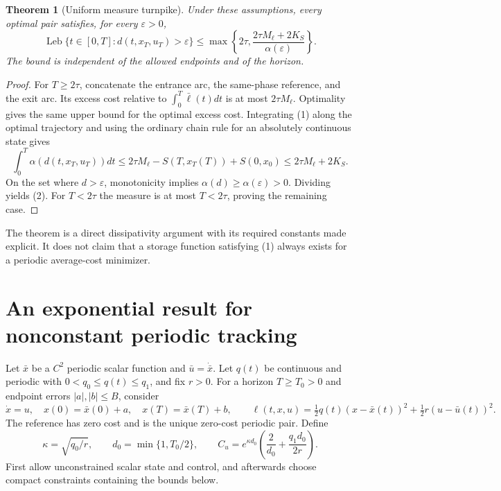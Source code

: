 \documentclass[11pt,a4paper]{article}
\newtheorem{theorem}{Theorem}[section]
\theoremstyle{definition}
\theoremstyle{remark}
\begin{document}
\begin{theorem}[Uniform measure turnpike]
Under these assumptions, every optimal pair satisfies, for every $\varepsilon>0$,
\[
 \operatorname{Leb}\{t\in[0,T]:d(t,x_T,u_T)>\varepsilon\}
 \le \max\left\{2\tau,
          \frac{2\tau M_\ell+2K_S}{\alpha(\varepsilon)}\right\}.
 \tag{2}
\]
The bound is independent of the allowed endpoints and of the horizon.
\end{theorem}
\begin{proof}
For $T\ge2\tau$, concatenate the entrance arc, the same-phase reference, and the exit arc. Its excess cost relative to $\int_0^T\bar\ell(t)dt$ is at most $2\tau M_\ell$. Optimality gives the same upper bound for the optimal excess cost. Integrating (1) along the optimal trajectory and using the ordinary chain rule for an absolutely continuous state gives
\[
 \int_0^T\alpha(d(t,x_T,u_T))dt
 \le 2\tau M_\ell-S(T,x_T(T))+S(0,x_0)
 \le2\tau M_\ell+2K_S.
\]
On the set where $d>\varepsilon$, monotonicity implies $\alpha(d)\ge\alpha(\varepsilon)>0$. Dividing yields (2). For $T<2\tau$ the measure is at most $T<2\tau$, proving the remaining case.
\end{proof}

The theorem is a direct dissipativity argument with its required constants made explicit. It does not claim that a storage function satisfying (1) always exists for a periodic average-cost minimizer.

\section{An exponential result for nonconstant periodic tracking}
Let $\bar x$ be a $C^2$ periodic scalar function and $\bar u=\dot{\bar x}$. Let $q(t)$ be continuous and periodic with
$0<q_0\le q(t)\le q_1$, and fix $r>0$. For a horizon $T\ge T_0>0$ and endpoint errors $|a|,|b|\le B$, consider
\[
 \dot x=u,\quad x(0)=\bar x(0)+a,\quad x(T)=\bar x(T)+b,
 \qquad
 \ell(t,x,u)=\tfrac12q(t)(x-\bar x(t))^2+
             \tfrac12r(u-\bar u(t))^2.
 \tag{3}
\]
The reference has zero cost and is the unique zero-cost periodic pair. Define
\[
 \kappa=\sqrt{q_0/r},\qquad
 d_0=\min\{1,T_0/2\},\qquad
 C_u=e^{\kappa d_0}\left(\frac2{d_0}+\frac{q_1d_0}{2r}\right).
 \tag{4}
\]
First allow unconstrained scalar state and control, and afterwards choose compact constraints containing the bounds below.
\end{document}
